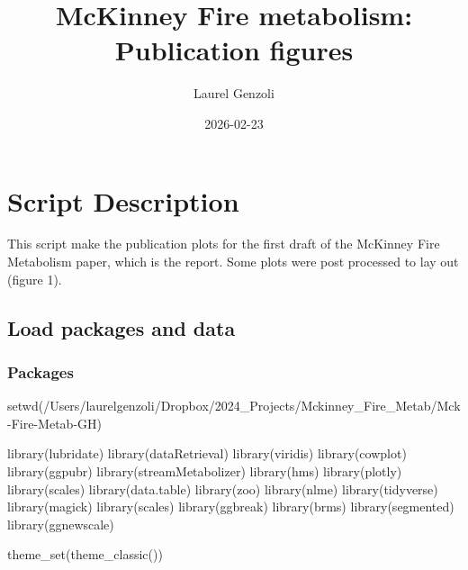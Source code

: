 \documentclass[
  letterpaper,
  DIV=11,
  numbers=noendperiod]{scrartcl}
\title{McKinney Fire metabolism: Publication figures}
\author{Laurel Genzoli}
\date{2026-02-23}
\newenvironment{Shaded}{\begin{snugshade}}{\end{snugshade}}
\newcommand{\FunctionTok}[1]{\textcolor[rgb]{0.28,0.35,0.67}{#1}}
\newcommand{\NormalTok}[1]{\textcolor[rgb]{0.00,0.23,0.31}{#1}}
\newcommand{\StringTok}[1]{\textcolor[rgb]{0.13,0.47,0.30}{#1}}
\renewcommand*\contentsname{Table of contents}
\newcommand\contentsname{Table of contents}
\begin{document}
\maketitle

\renewcommand*\contentsname{Table of contents}
{
\hypersetup{linkcolor=}
\setcounter{tocdepth}{3}
\tableofcontents
}

\section{Script Description}\label{script-description}

This script make the publication plots for the first draft of the
McKinney Fire Metabolism paper, which is the report. Some plots were
post processed to lay out (figure 1).

\subsection{Load packages and data}\label{load-packages-and-data}

\subsubsection{Packages}\label{packages}

\begin{Shaded}
\begin{Highlighting}[]
\FunctionTok{setwd}\NormalTok{(}\StringTok{\textquotesingle{}/Users/laurelgenzoli/Dropbox/2024\_Projects/Mckinney\_Fire\_Metab/Mck{-}Fire{-}Metab{-}GH\textquotesingle{}}\NormalTok{)}


\FunctionTok{library}\NormalTok{(lubridate)}
\FunctionTok{library}\NormalTok{(dataRetrieval)}
\FunctionTok{library}\NormalTok{(viridis)}
\FunctionTok{library}\NormalTok{(cowplot)}
\FunctionTok{library}\NormalTok{(ggpubr)}
\FunctionTok{library}\NormalTok{(streamMetabolizer)}
\FunctionTok{library}\NormalTok{(hms)}
\FunctionTok{library}\NormalTok{(plotly)}
\FunctionTok{library}\NormalTok{(scales)}
\FunctionTok{library}\NormalTok{(data.table)}
\FunctionTok{library}\NormalTok{(zoo)}
\FunctionTok{library}\NormalTok{(nlme)}
\FunctionTok{library}\NormalTok{(tidyverse)}
\FunctionTok{library}\NormalTok{(magick)}
\FunctionTok{library}\NormalTok{(scales)}
\FunctionTok{library}\NormalTok{(ggbreak)}
\FunctionTok{library}\NormalTok{(brms)}
\FunctionTok{library}\NormalTok{(segmented)}
\FunctionTok{library}\NormalTok{(ggnewscale)}


\FunctionTok{theme\_set}\NormalTok{(}\FunctionTok{theme\_classic}\NormalTok{())}
\end{Highlighting}
\end{Shaded}
\end{document}
